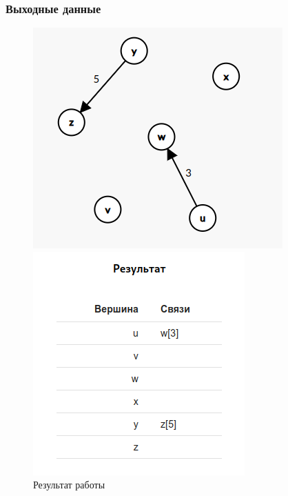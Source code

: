 \subsubsection{Выходные данные}
\begin{figure}[H]
  \begin{minipage}{0.5\textwidth}
    \centering\includegraphics[width=0.8\linewidth]{figs/task-4/res-graph-4.png}
  \end{minipage}
  \begin{minipage}{0.5\textwidth}
    \centering\includegraphics[width=0.8\linewidth]{figs/task-4/res-4.png}
  \end{minipage}
  \caption{Результат работы}
\end{figure}